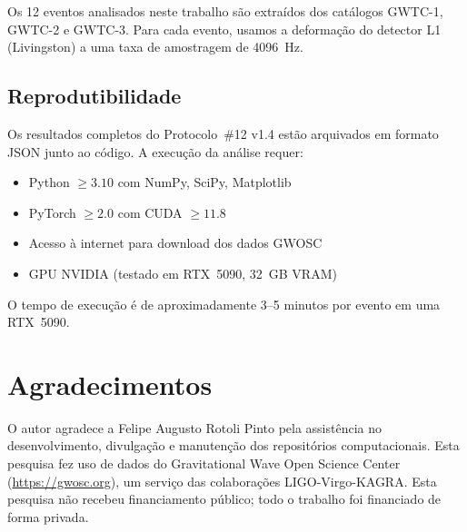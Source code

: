 \documentclass[12pt,a4paper,twocolumn]{article}
\begin{document}
Os 12 eventos analisados neste trabalho são extraídos dos catálogos GWTC-1, GWTC-2 e GWTC-3. Para cada evento, usamos a deformação do detector L1 (Livingston) a uma taxa de amostragem de 4096~Hz.

\subsection{Reprodutibilidade}

Os resultados completos do Protocolo~\#12 v1.4 estão arquivados em formato JSON junto ao código. A execução da análise requer:
\begin{itemize}[nosep]
\item Python $\geq 3.10$ com NumPy, SciPy, Matplotlib
\item PyTorch $\geq 2.0$ com CUDA $\geq 11.8$
\item Acesso à internet para download dos dados GWOSC
\item GPU NVIDIA (testado em RTX~5090, 32~GB VRAM)
\end{itemize}

O tempo de execução é de aproximadamente 3--5 minutos por evento em uma RTX~5090.


\section*{Agradecimentos}

O autor agradece a Felipe Augusto Rotoli Pinto pela assistência no desenvolvimento, divulgação e manutenção dos repositórios computacionais. Esta pesquisa fez uso de dados do Gravitational Wave Open Science Center (\url{https://gwosc.org}), um serviço das colaborações LIGO-Virgo-KAGRA. Esta pesquisa não recebeu financiamento público; todo o trabalho foi financiado de forma privada.
\end{document}
